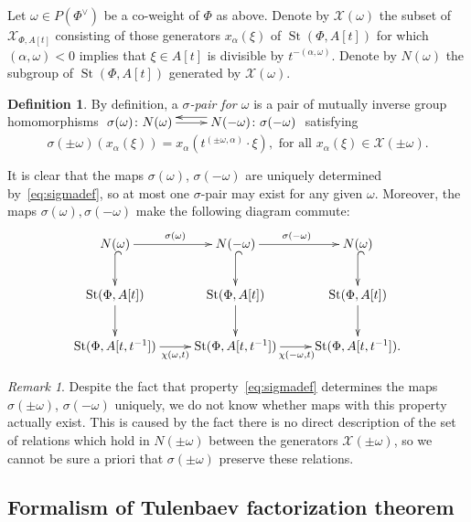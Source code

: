 \documentclass[oneside, 10pt]{amsart}
\DeclareMathOperator{\St}{St}
\newcommand{\XX}{\mathcal{X}}           %
\numberwithin{equation}{section}
\numberwithin{lemma}{section}
\theoremstyle{definition}
\newtheorem{dfn}[lemma]{Definition}
\theoremstyle{remark}
\newtheorem{rem}[lemma]{Remark}
\begin{document}
Let $\omega \in P(\Phi^\vee)$ be a co-weight of $\Phi$ as above.
Denote by $\XX(\omega)$ the subset of $\XX_{\Phi, A[t]}$ consisting of those generators $x_{\alpha}(\xi)$ of $\St(\Phi, A[t])$ for which 
$(\alpha, \omega) < 0$ implies that $\xi \in A[t]$ is divisible by $t^{-(\alpha, \omega)}$. Denote by $N(\omega)$ the subgroup of $\St(\Phi, A[t])$ generated by $\XX(\omega)$.

\begin{dfn} \label{dfn:sigma-pair}
By definition, a {\it $\sigma$-pair for $\omega$} is a pair of mutually inverse group homomorphisms 
$\xymatrix{ \sigma(\omega)\colon N(\omega) \ar[r] & \ar@<-1.0ex>[l] N(-\omega)\colon \sigma(-\omega) }$ satisfying
\begin{equation} \label{eq:sigmadef}
\sigma(\pm \omega)(x_\alpha(\xi)) = x_\alpha(t^{(\pm \omega, \alpha)}\cdot \xi), 
 \text{ for all } x_\alpha(\xi) \in \XX(\pm\omega).
\end{equation}\end{dfn}
It is clear that the maps $\sigma(\omega)$, $\sigma(-\omega)$ are uniquely determined by~\eqref{eq:sigmadef}, so at most one $\sigma$-pair may exist for any given $\omega$.
Moreover, the maps $\sigma(\omega), \sigma(-\omega)$ make the following diagram commute:
\begin{equation} \label{eq:sigma-diagram}
\xymatrix{ N(\omega) \ar[r]^{\sigma(\omega)}\ar@{^{(}->}[d] & N(-\omega) \ar@{^{(}->}[d] \ar[r]^{\sigma(-\omega)} & N(\omega) \ar@{^{(}->}[d] \\ 
          \St(\Phi, A[t]) \ar[d] & \St(\Phi, A[t]) \ar[d] & \St(\Phi, A[t]) \ar[d] \\
          \St(\Phi, A[t, t^{-1}]) \ar@<-0.0ex>[r]_{\chi(\omega, t)} & \St(\Phi, A[t, t^{-1}]) \ar@<-0.0ex>[r]_{\chi(-\omega, t)} & \St(\Phi, A[t, t^{-1}]).} \end{equation}  

\begin{rem} Despite the fact that property~\eqref{eq:sigmadef} determines the maps $\sigma(\pm \omega)$, $\sigma(-\omega)$ uniquely, 
 we do not know whether maps with this property actually exist.
This is caused by the fact there is no direct description of the set of relations which hold in $N(\pm\omega)$ between the generators $\XX(\pm\omega)$, 
 so we cannot be sure a priori that $\sigma(\pm\omega)$ preserve these relations. \end{rem}

\subsection{Formalism of Tulenbaev factorization theorem}
\end{document}
